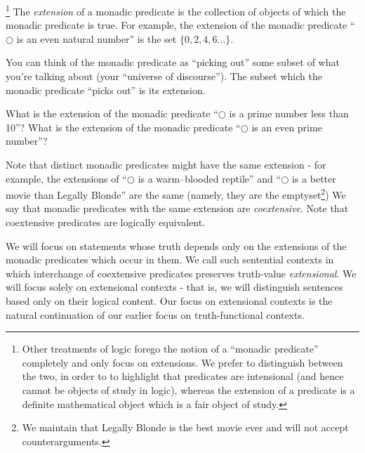 \begin{definition}\footnote{Other treatments of logic forego the notion of a ``monadic predicate'' completely and only focus on extensions. We prefer to distinguish between the two, in order to to highlight that predicates are intensional (and hence cannot be objects of study in logic), whereas the extension of a predicate is a definite mathematical object which is a fair object of study.}
    The \emph{extension} of a monadic predicate is the collection of objects of which the monadic predicate is true. For example, the extension of the monadic predicate ``$\bigcirc$ is an even natural number'' is the set $\{0,2,4,6...\}.$


    You can think of the monadic predicate as ``picking out'' some subset of what you're talking about (your ``universe of discourse''). The subset which the monadic predicate ``picks out'' is its extension. 
\end{definition}

\begin{aside}
    What is the extension of the monadic predicate ``$\bigcirc$ is a prime number less than 10''? What is the extension of the monadic predicate ``$\bigcirc$ is an even prime number''?
\end{aside}

Note that distinct monadic predicates might have the same extension - for example, the extensions of ``$\bigcirc$ is a warm--blooded reptile'' and ``$\bigcirc$ is a better movie than Legally Blonde'' are the same (namely, they are the emptyset\footnote{We maintain that Legally Blonde is the best movie ever and will not accept counterarguments.}) We say that monadic predicates with the same extension are \emph{coextensive}. Note that coextensive predicates are logically equivalent. 

We will focus on statements whose truth depends only on the extensions of the monadic predicates which occur in them. We call such sentential contexts in which interchange of coextensive predicates preserves truth-value \emph{extensional}. We will focus solely on extensional contexts - that is, we will distinguish sentences based only on their logical content. Our focus on extensional contexts is the natural continuation of our earlier focus on truth-functional contexts.